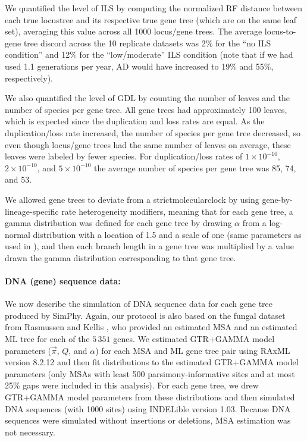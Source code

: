 We quantified the level of ILS by computing the normalized RF distance between each true \gls{locustree} and its respective true gene tree (which are on the same leaf set), averaging this value across all 1000 locus/gene trees.
The average locus-to-gene tree discord across the 10 replicate datasets was 2\% for the ``no ILS condition'' and 12\% for the ``low/moderate'' ILS condition (note that if we had used 1.1 generations per year, AD would have increased to 19\% and 55\%, respectively).

We also quantified the level of GDL by counting the number of leaves and the number of species per gene tree.
All gene trees had approximately 100 leaves, which is expected since the duplication and loss rates are equal.
As the duplication/loss rate increased, the number of species per gene tree decreased, so even though locus/gene trees had the same number of leaves on average, these leaves were labeled by fewer species.
For duplication/loss rates of $1 \times 10^{-10}$, $2 \times 10^{-10}$, and  $5 \times 10^{-10}$ the average number of species per gene tree was 85, 74, and 53.

We allowed gene trees to deviate from a \gls{strictmolecularclock} by using gene-by-lineage-specific rate heterogeneity modifiers, meaning that for each gene tree, a gamma distribution was defined for each gene tree by drawing $\alpha$ from a log-normal distribution with a location of 1.5 and a scale of one (same parameters as used in \cite{zhang2018astral}), and then each branch length in a gene tree was multiplied by a value drawn the gamma distribution corresponding to that gene tree.

\paragraph{DNA (gene) sequence data:}
We now describe the simulation of DNA sequence data for each gene tree produced by SimPhy.
Again, our protocol is also based on the fungal dataset from Rasmussen and Kellis \cite{rasmussen2012unified}, who provided an estimated \gls{MSA} and an estimated \gls{ML} tree for each of the $5\,351$ genes.
We estimated \gls{GTR+GAMMA} model parameters ($\vec{\pi}$, $Q$, and $\alpha$) for each MSA and ML gene tree pair using \gls{RAxML} version 8.2.12 and then fit distributions to the estimated GTR+GAMMA model parameters (only MSAs with least 500 \gls{parsimony-informative} sites and at most 25\% \glspl{gap} were included in this analysis).
For each gene tree, we drew GTR+GAMMA model parameters from these distributions and then simulated DNA sequences (with 1000 sites) using \gls{INDELible} version 1.03.
Because DNA sequences were simulated without insertions or deletions, MSA estimation was not necessary.

